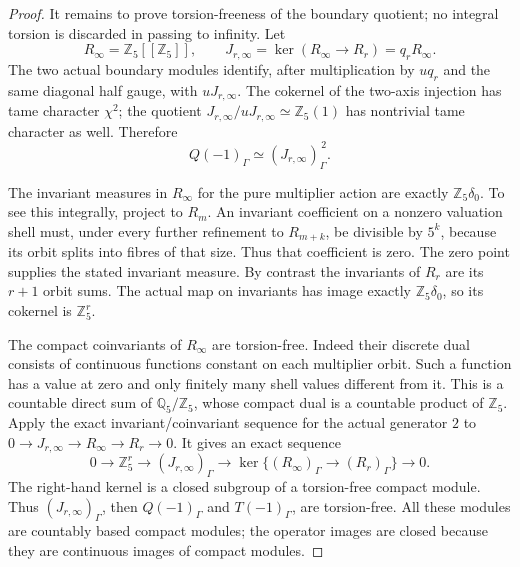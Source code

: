 \begin{proof}
It remains to prove torsion-freeness of the boundary quotient;
no integral torsion is discarded in passing to infinity.
Let
\[
 R_\infty=\mathbb Z_5[[\mathbb Z_5]],\qquad
 J_{r,\infty}=\ker(R_\infty\longrightarrow R_r)=q_rR_\infty.
\]
The two actual boundary modules identify, after multiplication
by \(u q_r\) and the same diagonal half gauge, with
\(uJ_{r,\infty}\). The cokernel of the two-axis injection
has tame character \(\chi^2\); the quotient
\(J_{r,\infty}/uJ_{r,\infty}\simeq\mathbb Z_5(1)\)
has nontrivial tame character as well. Therefore
\[
                 Q(-1)_\Gamma\simeq
                       (J_{r,\infty})_\Gamma^{\,2}.   \tag{D.88.20}
\]

The invariant measures in \(R_\infty\) for the pure multiplier
action are exactly \(\mathbb Z_5\delta_0\). To see this
integrally, project to \(R_m\). An invariant coefficient on
a nonzero valuation shell must, under every further refinement
to \(R_{m+k}\), be divisible by \(5^k\), because its orbit
splits into fibres of that size. Thus that coefficient is zero.
The zero point supplies the stated invariant measure. By
contrast the invariants of \(R_r\) are its \(r+1\) orbit
sums. The actual map on invariants has image exactly
\(\mathbb Z_5\delta_0\), so its cokernel is \(\mathbb Z_5^r\).

The compact coinvariants of \(R_\infty\) are torsion-free.
Indeed their discrete dual consists of continuous functions
constant on each multiplier orbit. Such a function has a value
at zero and only finitely many shell values different from it.
This is a countable direct sum of \(\mathbb Q_5/\mathbb Z_5\),
whose compact dual is a countable product of \(\mathbb Z_5\).
Apply the exact invariant/coinvariant sequence for the actual
generator \(2\) to \(0\to J_{r,\infty}\to R_\infty\to R_r\to0\).
It gives an exact sequence
\[
 0\longrightarrow\mathbb Z_5^r\longrightarrow
    (J_{r,\infty})_\Gamma\longrightarrow
    \ker\{(R_\infty)_\Gamma\to(R_r)_\Gamma\}
                         \longrightarrow0.            \tag{D.88.21}
\]
The right-hand kernel is a closed subgroup of a torsion-free
compact module. Thus \((J_{r,\infty})_\Gamma\), then
\(Q(-1)_\Gamma\) and \(T(-1)_\Gamma\), are torsion-free.
All these modules are countably based compact modules; the
operator images are closed because they are continuous images
of compact modules.


\end{proof}

